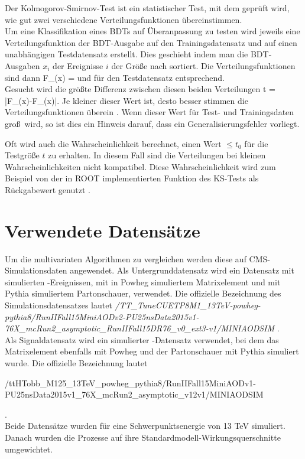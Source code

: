 Der Kolmogorov-Smirnov-Test ist ein statistischer Test, mit dem gepr\"uft wird, wie gut zwei verschiedene Verteilungsfunktionen \"ubereinstimmen.\\
Um eine Klassifikation eines BDTs auf \"Uberanpassung zu testen wird jeweils eine Verteilungsfunktion der BDT-Ausgabe auf den Trainingsdatensatz und auf einen unabh\"angigen Testdatensatz erstellt. Dies geschieht indem man die BDT-Ausgaben $x_i$ der Ereignisse $i$ der Gr\"o\ss e nach sortiert. Die Verteilungsfunktionen sind dann
\beq
F_{}(x) = 
\label{eq:CDF_train}
\eeq
und f\"ur den Testdatensatz entsprechend.\\
Gesucht wird die gr\"o\ss te Differenz zwischen diesen beiden Verteilungen
\beq
t = \cdot\max\left|F_{}(x)-F_{}(x)\right|.
\label{eq:KSTest}
\eeq
Je kleiner dieser Wert ist, desto besser stimmen die Verteilungsfunktionen \"uberein \cite{Blobel}. Wenn dieser Wert f\"ur Test- und Trainingsdaten gro\ss~wird, so ist dies ein Hinweis darauf, dass ein Generalisierungsfehler vorliegt.

Oft wird auch die Wahrscheinlichkeit berechnet, einen Wert $\leq t_0$ f\"ur die Testgr\"o\ss e $t$ zu erhalten. In diesem Fall sind die Verteilungen bei kleinen Wahrscheinlichkeiten nicht kompatibel. Diese Wahrscheinlichkeit wird zum Beispiel von der in ROOT implementierten Funktion des KS-Tests als R\"uckgabewert genutzt \cite{ROOT:TH1F}.

\section{Verwendete Datens\"atze}
\label{ch:Vergleich:sec:Daten}

Um die multivariaten Algorithmen zu vergleichen werden diese auf CMS-Simulationsdaten angewendet. Als Untergrunddatensatz wird ein Datensatz mit simulierten \ttb-Ereignissen, mit in Powheg \cite{Frixione:2007vw} simuliertem Matrixelement und mit Pythia \cite{Sjostrand2015159} simuliertem Partonschauer, verwendet. Die offizielle Bezeichnung des Simulationsdatensatzes lautet {\it/TT\_TuneCUETP8M1\_13TeV-powheg-pythia8/RunIIFall15MiniAODv2-PU25nsData2015v1-76X\_mcRun2\_asymptotic\_RunIIFall15DR76\_v0\_ext3-v1/MINIAODSIM }.\\
Als Signaldatensatz wird ein simulierter \ttH-Datensatz verwendet, bei dem das Matrixelement ebenfalls mit Powheg und der Partonschauer mit Pythia simuliert wurde. Die offizielle Bezeichnung lautet \begin{it}/ttHTobb\_M125\_13TeV\_powheg\_pythia8/RunIIFall15MiniAODv1-PU25nsData2015v1\_76X\_mcRun2\_asymptotic\_v12v1/MINIAODSIM\end{it}.\\
Beide Datens\"atze wurden f\"ur eine Schwerpunktsenergie von \num{13} \si{\tera\electronvolt} simuliert. Danach wurden die Prozesse auf ihre Standardmodell-Wirkungsquerschnitte umgewichtet.

